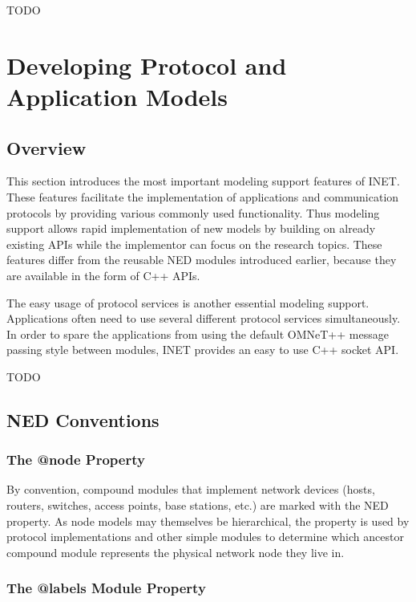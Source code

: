 \ifdraft TODO

\chapter{Developing Protocol and Application Models}
\label{cha:developing-models}

\section{Overview}

This section introduces the most important modeling support features of
INET. These features facilitate the implementation of applications and
communication protocols by providing various commonly used functionality.
Thus modeling support allows rapid implementation of new models by building
on already existing APIs while the implementor can focus on the research
topics. These features differ from the reusable NED modules introduced
earlier, because they are available in the form of C++ APIs.

The easy usage of protocol services is another essential modeling support.
Applications often need to use several different protocol services
simultaneously. In order to spare the applications from using the default
OMNeT++ message passing style between modules, INET provides an easy to use
C++ socket API.

 TODO
\section{NED Conventions}


\subsection{The @node Property}

By convention, compound modules that implement network devices (hosts,
routers, switches, access points, base stations, etc.) are marked with the
 NED property. As node models may themselves be hierarchical, the
 property is used by protocol implementations and other simple
modules to determine which ancestor compound module represents the physical
network node they live in.

\subsection{The @labels Module Property}

